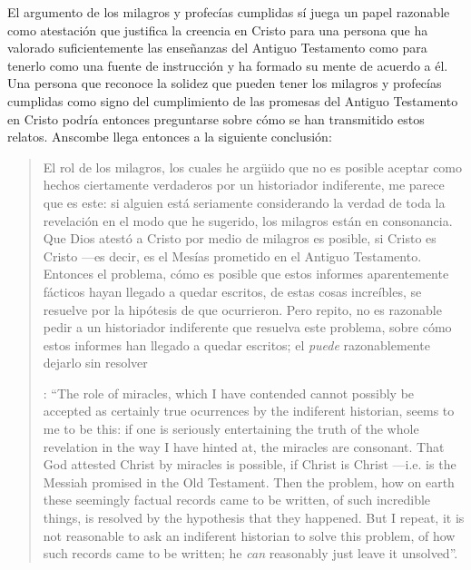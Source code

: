 El argumento de los milagros y profecías cumplidas sí juega un papel razonable como atestación que justifica la creencia en Cristo para una persona que ha valorado suficientemente las enseñanzas del Antiguo Testamento como para tenerlo como una fuente de instrucción y ha formado su mente de acuerdo a él. Una persona que reconoce la solidez que pueden tener los milagros y profecías cumplidas como signo del cumplimiento de las promesas del Antiguo Testamento en Cristo podría entonces preguntarse sobre cómo se han transmitido estos relatos. Anscombe llega entonces a la siguiente conclusión: \blockquote[{\Cite[37]{anscombe2008faith:prophandmi}}: \enquote{The role of miracles, which I have contended cannot possibly be accepted as certainly true ocurrences by the indiferent historian, seems to me to be this: if one is seriously entertaining the truth of the whole revelation in the way I have hinted at, the miracles are consonant. That God attested Christ by miracles is possible, if Christ is Christ ---i.e. is the Messiah promised in the Old Testament. Then the problem, how on earth these seemingly factual records came to be written, of such incredible things, is resolved by the hypothesis that they happened. \textelp{} But I repeat, it is not reasonable to ask an indiferent historian to solve this problem, of how such records came to be written; he \emph{can} reasonably just leave it unsolved}.]{El rol de los milagros, los cuales he argüido que no es posible aceptar como hechos ciertamente verdaderos por un historiador indiferente, me parece que es este: si alguien está seriamente considerando la verdad de toda la revelación en el modo que he sugerido, los milagros están en consonancia. Que Dios atestó a Cristo por medio de milagros es posible, si Cristo es Cristo ---es decir, es el Mesías prometido en el Antiguo Testamento. Entonces el problema, cómo es posible que estos informes aparentemente fácticos hayan llegado a quedar escritos, de estas cosas increíbles, se resuelve por la hipótesis de que ocurrieron. \textelp{} Pero repito, no es razonable pedir a un historiador indiferente que resuelva este problema, sobre cómo estos informes han llegado a quedar escritos; el \emph{puede} razonablemente dejarlo sin resolver}.

